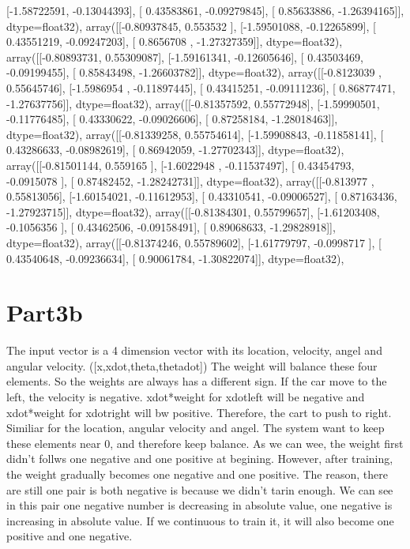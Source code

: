 \documentclass{article}
\begin{document}
       [-1.58722591, -0.13044393],
       [ 0.43583861, -0.09279845],
       [ 0.85633886, -1.26394165]], dtype=float32), array([[-0.80937845,  0.553532  ],
       [-1.59501088, -0.12265899],
       [ 0.43551219, -0.09247203],
       [ 0.8656708 , -1.27327359]], dtype=float32), array([[-0.80893731,  0.55309087],
       [-1.59161341, -0.12605646],
       [ 0.43503469, -0.09199455],
       [ 0.85843498, -1.26603782]], dtype=float32), array([[-0.8123039 ,  0.55645746],
       [-1.5986954 , -0.11897445],
       [ 0.43415251, -0.09111236],
       [ 0.86877471, -1.27637756]], dtype=float32), array([[-0.81357592,  0.55772948],
       [-1.59990501, -0.11776485],
       [ 0.43330622, -0.09026606],
       [ 0.87258184, -1.28018463]], dtype=float32), array([[-0.81339258,  0.55754614],
       [-1.59908843, -0.11858141],
       [ 0.43286633, -0.08982619],
       [ 0.86942059, -1.27702343]], dtype=float32), array([[-0.81501144,  0.559165  ],
       [-1.6022948 , -0.11537497],
       [ 0.43454793, -0.0915078 ],
       [ 0.87482452, -1.28242731]], dtype=float32), 
array([[-0.813977  ,  0.55813056],
       [-1.60154021, -0.11612953],
       [ 0.43310541, -0.09006527],
       [ 0.87163436, -1.27923715]], dtype=float32), array([[-0.81384301,  0.55799657],
       [-1.61203408, -0.1056356 ],
       [ 0.43462506, -0.09158491],
       [ 0.89068633, -1.29828918]], dtype=float32), array([[-0.81374246,  0.55789602],
       [-1.61779797, -0.0998717 ],
       [ 0.43540648, -0.09236634],
       [ 0.90061784, -1.30822074]], dtype=float32), 




\section{Part3b}
The input  vector is  a  4 dimension vector  with its location,  velocity, angel  and angular velocity. ([x,xdot,theta,thetadot]) The weight will balance these four  elements.  So the weights are always has a  different sign.  If the  car move to the  left, the velocity is negative.  xdot*weight for xdotleft will be negative and xdot*weight for xdotright will bw positive. Therefore, the cart to push to right. Similiar for the location, angular velocity and  angel. The system want to keep these elements near 0, and therefore keep balance. As we can wee, the weight first didn't follws one negative and one positive at begining. However, after training, the weight gradually becomes one negative and one positive. The reason, there are still one pair is both negative is because we didn't tarin enough. We can see in this pair one negative number is decreasing in absolute value, one negative is increasing in absolute value. If we continuous to train it, it will also become one positive and one negative. 
\end{document}
